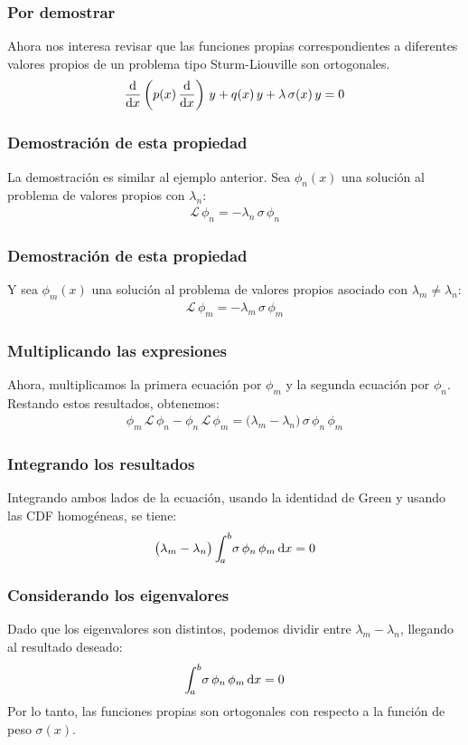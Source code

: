 \documentclass[12pt]{beamer}
\begin{document}
\begin{frame}
\frametitle{Por demostrar}
Ahora nos interesa revisar que las funciones propias correspondientes a diferentes valores propios de un problema tipo Sturm-Liouville son ortogonales.
\pause
\begin{align*}
\dv{x} \left( p(x) \, \dv{x} \right) \, y + q(x) \, y + \lambda \, \sigma (x) \, y = 0
\end{align*}
\end{frame}
\begin{frame}
\frametitle{Demostración de esta propiedad}
La demostración es similar al ejemplo anterior. Sea $\phi_{n}(x)$ una solución al problema de valores propios con $\lambda_{n}$:
\pause
\begin{align*}
\mathcal{L} \, \phi_{n} = - \lambda_{n} \, \sigma \, \phi_{n}
\end{align*}
\end{frame}
\begin{frame}
\frametitle{Demostración de esta propiedad}
Y sea $\phi_{m}(x)$ una solución al problema de valores propios asociado con $\lambda_{m} \neq \lambda_{n}$:
\pause
\begin{align*}
\mathcal{L} \, \phi_{m} = - \lambda_{m} \, \sigma \, \phi_{m}
\end{align*}
\end{frame}
\begin{frame}
\frametitle{Multiplicando las expresiones}
Ahora, multiplicamos la primera ecuación por $\phi_{m}$ y la segunda ecuación por $\phi_{n}$. \pause Restando estos resultados, obtenemos:
\pause
\begin{align*}
\phi_{m}\, \mathcal{L} \, \phi_{n} - \phi_{n} \, \mathcal{L} \, \phi_{m} = \big( \lambda_{m} - \lambda_{n} \big) \, \sigma \, \phi_{n} \, \phi_{m}
\end{align*}
\end{frame}
\begin{frame}
\frametitle{Integrando los resultados}
Integrando ambos lados de la ecuación, usando la identidad de Green y usando las CDF homogéneas, se tiene:
\pause
\begin{align*}
\big( \lambda_{m} - \lambda_{n} \big) \, \scaleint{5ex}_{\bs a}^{b} \sigma \, \phi_{n} \, \phi_{m} \dd{x} = 0
\end{align*}
\end{frame}
\begin{frame}
\frametitle{Considerando los eigenvalores}
Dado que los eigenvalores son distintos, podemos dividir entre $\lambda_{m} - \lambda_{n}$, llegando al resultado deseado:
\pause
\begin{align*}
\scaleint{5ex}_{\bs a}^{b} \sigma \, \phi_{n} \, \phi_{m} \dd{x} = 0
\end{align*}
Por lo tanto, las funciones propias son ortogonales con respecto a la función de peso $\sigma(x)$.
\end{frame}
\end{document}
